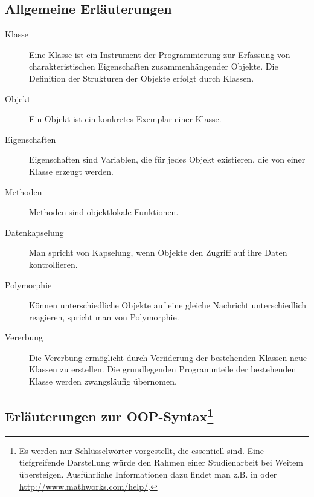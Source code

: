 
\subsection*{Allgemeine Erl\"auterungen}
\begin{description}

	\item[Klasse] Eine Klasse ist ein Instrument der Programmierung zur
	Erfassung von charakteristischen Eigenschaften zusammenh\"angender
	Objekte. Die Definition der Strukturen der Objekte erfolgt durch
	Klassen.

	\item[Objekt] Ein Objekt ist ein konkretes Exemplar einer
	Klasse.

	\item[Eigenschaften] Eigenschaften sind Variablen, die f\"ur jedes
	Objekt existieren, die von einer Klasse erzeugt werden.

	\item[Methoden] Methoden sind objektlokale Funktionen.

	\item[Datenkapselung] Man spricht von Kapselung, wenn Objekte den
	Zugriff auf ihre Daten kontrollieren.

	\item[Polymorphie] K\"onnen unterschiedliche Objekte auf eine gleiche
	Nachricht unterschiedlich reagieren, spricht man von Polymorphie.

	\item[Vererbung] Die Vererbung erm\"oglicht durch Ver\"nderung der
	bestehenden Klassen neue Klassen zu erstellen. Die grundlegenden
	Programmteile der bestehenden Klasse werden zwangsl\"aufig
	\"ubernomen.

\end{description}


\subsection*{Erl\"auterungen zur OOP-Syntax\footnote{ Es werden nur
Schl\"usselw\"orter vorgestellt, die essentiell sind. Eine tiefgreifende
Darstellung w\"urde den Rahmen einer Studienarbeit bei Weitem \"ubersteigen.
Ausf\"uhrliche Informationen dazu findet man z.B. in \cite{matlab_kompakt} oder
\url{http://www.mathworks.com/help/}.}}

